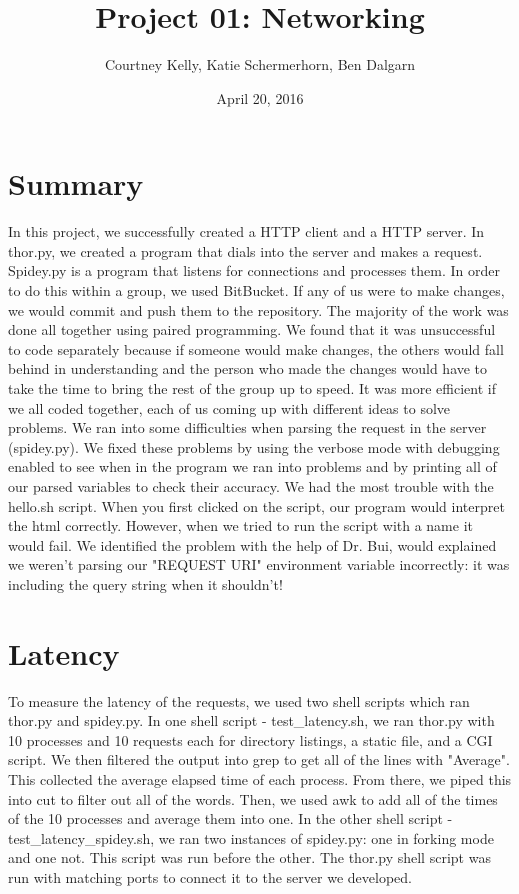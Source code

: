\documentclass{article}
\title{Project 01: Networking}
\author{Courtney Kelly, Katie Schermerhorn, Ben Dalgarn}
\date{April 20, 2016}
\begin{document}
    
    \maketitle
    
    \section*{Summary}
    
    In this project, we successfully created a HTTP client and a HTTP server.  In thor.py, we created a program that dials into the server and makes a request.  Spidey.py is a program that listens for connections and processes them.  In order to do this within a group, we used BitBucket.  If any of us were to make changes, we would commit and push them to the repository.  The majority of the work was done all together using paired programming. We found that it was unsuccessful to code separately because if someone would make changes, the others would fall behind in understanding and the person who made the changes would have to take the time to bring the rest of the group up to speed. It was more efficient if we all coded together, each of us coming up with different ideas to solve problems.
    \newline
    \newline
    We ran into some difficulties when parsing the request in the server (spidey.py).  We fixed these problems by using the verbose mode with debugging enabled to see when in the program we ran into problems and by printing all of our parsed variables to check their accuracy. We had the most trouble with the hello.sh script. When you first clicked on the script, our program would interpret the html correctly. However, when we tried to run the script with a name it would fail. We identified the problem with the help of Dr. Bui, would explained we weren't parsing our "REQUEST URI" environment variable incorrectly: it was including the query string when it shouldn't!
    
    \section*{Latency}
    To measure the latency of the requests, we used two shell scripts which ran thor.py and spidey.py. In one shell script - test_latency.sh, we ran thor.py with 10 processes and 10 requests each for directory listings, a static file, and a CGI script.  We then filtered the output into grep to get all of the lines with "Average".  This collected the average elapsed time of each process.  From there, we piped this into cut to filter out all of the words.  Then, we used awk to add all of the times of the 10 processes and average them into one.  In the other shell script - test_latency_spidey.sh, we ran two instances of spidey.py: one in forking mode and one not.  This script was run before the other.  The thor.py shell script was run with matching ports to connect it to the server we developed. 
    
\end{document}
